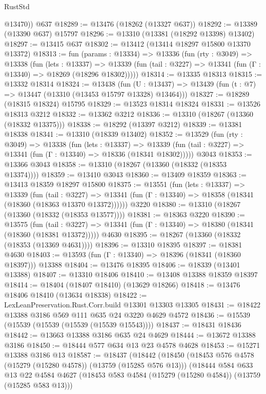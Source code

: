 \begin{lexlean}{RustStd}
\begin{coremodule}
        @13470))
    @637
@18289 := @13476 (@18262 (@13327 @637))
@18292 := @13389 (@13390 @637) @15797
@18296 := @13310 (@13381 (@18292 @13398) @13402)
@18297 := @13415 @637
@18302 := @13412 (@13414 @18297 @15800 @13370 @13372)
@18313 := fun (params : @13334) =>
  @13336
    (fun (rty : @3049) =>
    @13338
      (fun (lets : @13337) =>
      @13339 (fun (tail : @3227) => @13341 (fun (Γ : @13340) => @18269 (@18296 @18302)))))
@18314 := @13335 @18313
@18315 := @13332 @18314
@18324 := @13438
    (fun (U : @13437) => @13439 (fun (t : @7) => @13447 (@13310 (@13453 @15797 @13328) @13464)))
@18327 := @18289 (@18315 @18324) @15795
@18329 := @13523 @18314 @18324
@18331 := @13526 @18313 @3212
@18332 := @13362 @3212
@18336 := @13310 (@18267 (@13360 (@18332 @13375)))
@18338 := @18292 (@13397 @3212)
@18339 := @13381 @18338
@18341 := @13310 (@18339 @13402)
@18352 := @13529
    (fun (rty : @3049) =>
    @13338
      (fun (lets : @13337) =>
      @13339 (fun (tail : @3227) => @13341 (fun (Γ : @13340) => @18336 (@18341 @18302)))))
    @3043
@18353 := @13366 @3043
@18358 := @13310 (@18267 (@13360 (@18332 (@18353 @13374))))
@18359 := @13410 @3043
@18360 := @13409 @18359
@18363 := @13413 @18359 @18297 @15800
@18375 := @13551
    (fun (lets : @13337) =>
    @13339
      (fun (tail : @3227) =>
      @13341 (fun (Γ : @13340) => @18358 (@18341 (@18360 (@18363 @13370 @13372))))))
    @3220
@18380 := @13310 (@18267 (@13360 (@18332 (@18353 @13577))))
@18381 := @18363 @3220
@18390 := @13575
    (fun (tail : @3227) => @13341 (fun (Γ : @13340) => @18380 (@18341 (@18360 (@18381 @13372)))))
    @4630
@18395 := @18267 (@13360 (@18332 (@18353 (@13369 @4631))))
@18396 := @13310 @18395
@18397 := @18381 @4630
@18403 := @13593 (fun (Γ : @13340) => @18396 (@18341 (@18360 @18397))) @13388
@18404 := @13476 @18395
@18406 := @18339 (@13401 @13388)
@18407 := @13310 @18406
@18410 := @13408 @13388 @18359 @18397
@18414 := @18404 (@18407 @18410) (@13629 @18266)
@18418 := @13476 @18406 @18410 (@13634 @18338)
@18422 := LexLeanPreservation.Rust.Corr.build @13301 @13303 @13305
@18431 := @18422 @13388 @3186 @569 @111 @635 @24 @3220 @4629 @4572
@18436 := @15539 (@15539 (@15539 (@15539 (@15539 @15543))))
@18437 := @18431 @18436
@18442 := @13663 @13388 @3186 @635 @24 @4629
@18444 := @13672 @13388 @3186
@18450 := @18444 @577 @634 @13 @23 @4578 @4628
@18453 := @15271 @13388 @3186 @13
@18587 := @18437
    (@18442
      (@18450
        (@18453 @576 @4578 (@15279 (@15280 @4578)) (@13759 (@15285 @576 @13)))
        (@18444
          @584
          @633
          @13
          @22
          @4584
          @4627
          (@18453 @583 @4584 (@15279 (@15280 @4584)) (@13759 (@15285 @583 @13)))

\end{coremodule}
\end{lexlean}
